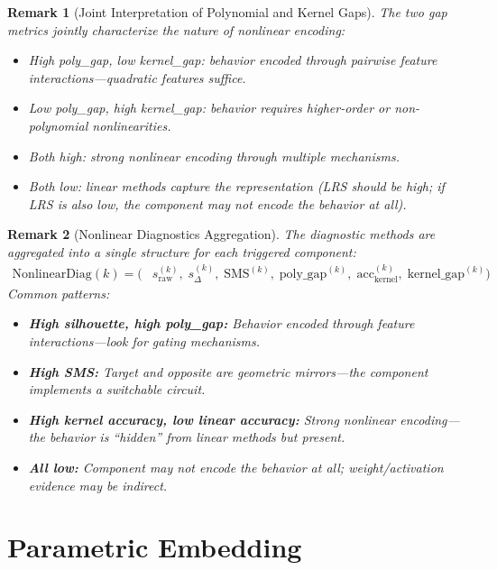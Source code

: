 \documentclass[11pt]{article}
\newtheorem{remark}{Remark}[section]
\begin{document}
\begin{remark}[Joint Interpretation of Polynomial and Kernel Gaps]
\label{rem:joint-polynomial-kernel-gaps}
The two gap metrics jointly characterize the nature of nonlinear encoding:
\begin{itemize}[nosep]
\item High poly\_gap, low kernel\_gap: behavior encoded through pairwise feature interactions---quadratic features suffice.
\item Low poly\_gap, high kernel\_gap: behavior requires higher-order or non-polynomial nonlinearities.
\item Both high: strong nonlinear encoding through multiple mechanisms.
\item Both low: linear methods capture the representation (LRS should be high; if LRS is also low, the component may not encode the behavior at all).
\end{itemize}
\end{remark}

\begin{remark}[Nonlinear Diagnostics Aggregation]
\label{rem:nonlinear-diagnostics-aggregation}
The diagnostic methods are aggregated into a single structure for each triggered component:
\begin{align}
\text{NonlinearDiag}(k) = \bigl(&s_{\text{raw}}^{(k)},\; s_{\Delta}^{(k)},\; \text{SMS}^{(k)},\; \text{poly\_gap}^{(k)},\; \text{acc}_{\text{kernel}}^{(k)},\; \text{kernel\_gap}^{(k)}\bigr)
\end{align}
Common patterns:
\begin{itemize}[nosep]
\item \textbf{High silhouette, high poly\_gap:} Behavior encoded through feature interactions---look for gating mechanisms.
\item \textbf{High SMS:} Target and opposite are geometric mirrors---the component implements a switchable circuit.
\item \textbf{High kernel accuracy, low linear accuracy:} Strong nonlinear encoding---the behavior is ``hidden'' from linear methods but present.
\item \textbf{All low:} Component may not encode the behavior at all; weight/activation evidence may be indirect.
\end{itemize}
\end{remark}

\section{Parametric Embedding}
\label{app:parametric}
\end{document}
